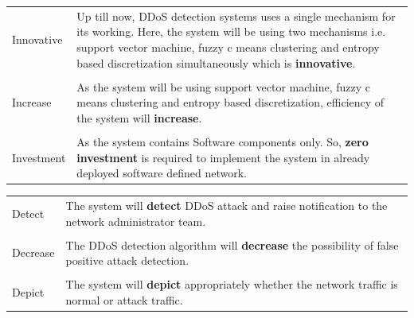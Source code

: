 \documentclass[12pt,a4paper,final]{report}
\begin{document}
\begin{center}
\begin{tabular}{|m{2cm}|m{7cm}|}
\hline
Innovative & Up till now, DDoS detection systems uses a single mechanism for its working. Here, the system will be using two mechanisms i.e. support vector machine, fuzzy c means clustering and entropy based discretization simultaneously which is \textbf{innovative}. \\

&\\

Increase & As the system will be using support vector machine, fuzzy c means clustering and entropy based discretization, efficiency of the system will \textbf{increase}. \\

&\\

Investment & As the system contains Software components only. So, \textbf{zero investment} is required to implement the system in already deployed software defined network. \\

\hline
\end{tabular}
\end{center}

\vspace*{1cm}
\begin{center}
\begin{tabular}{|m{2cm}|m{7cm}|}
\hline

Detect & The system will \textbf{detect} DDoS attack and raise notification to the network administrator team. \\

&\\

Decrease & The DDoS detection algorithm will \textbf{decrease} the possibility of false positive attack detection. \\

&\\

Depict & The system will \textbf{depict} appropriately whether the network traffic is normal or attack traffic. \\

\hline
\end{tabular}
\end{center}
\end{document}
